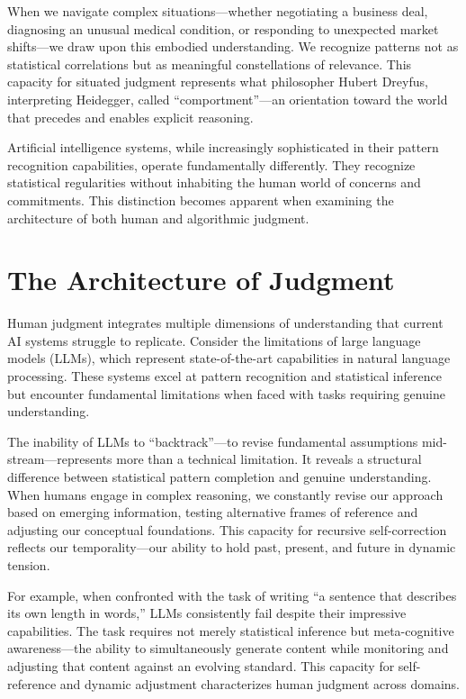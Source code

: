 \documentclass[
  Letterpaper,
]{scrbook}
\begin{document}
When we navigate complex situations---whether negotiating a business
deal, diagnosing an unusual medical condition, or responding to
unexpected market shifts---we draw upon this embodied understanding. We
recognize patterns not as statistical correlations but as meaningful
constellations of relevance. This capacity for situated judgment
represents what philosopher Hubert Dreyfus, interpreting Heidegger,
called ``comportment''---an orientation toward the world that precedes
and enables explicit reasoning.

Artificial intelligence systems, while increasingly sophisticated in
their pattern recognition capabilities, operate fundamentally
differently. They recognize statistical regularities without inhabiting
the human world of concerns and commitments. This distinction becomes
apparent when examining the architecture of both human and algorithmic
judgment.

\section{The Architecture of
Judgment}\label{the-architecture-of-judgment}

Human judgment integrates multiple dimensions of understanding that
current AI systems struggle to replicate. Consider the limitations of
large language models (LLMs), which represent state-of-the-art
capabilities in natural language processing. These systems excel at
pattern recognition and statistical inference but encounter fundamental
limitations when faced with tasks requiring genuine understanding.

The inability of LLMs to ``backtrack''---to revise fundamental
assumptions mid-stream---represents more than a technical limitation. It
reveals a structural difference between statistical pattern completion
and genuine understanding. When humans engage in complex reasoning, we
constantly revise our approach based on emerging information, testing
alternative frames of reference and adjusting our conceptual
foundations. This capacity for recursive self-correction reflects our
temporality---our ability to hold past, present, and future in dynamic
tension.

For example, when confronted with the task of writing ``a sentence that
describes its own length in words,'' LLMs consistently fail despite
their impressive capabilities. The task requires not merely statistical
inference but meta-cognitive awareness---the ability to simultaneously
generate content while monitoring and adjusting that content against an
evolving standard. This capacity for self-reference and dynamic
adjustment characterizes human judgment across domains.
\end{document}
